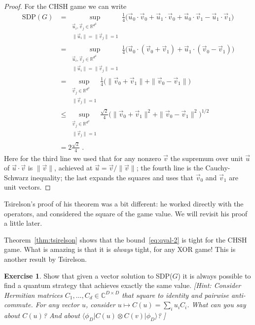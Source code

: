 \documentclass{report}
\theoremstyle{plain}
\theoremstyle{definition}
\newtheorem{exercise}[subsection]{Exercise}
\theoremstyle{remark}
\newcommand{\ket}[1]{|#1\rangle}
\newcommand{\bra}[1]{\langle#1|}
\newcommand{\C}{\ensuremath{\mathbb{C}}}
\newcommand{\R}{\ensuremath{\mathbb{R}}}
\numberwithin{equation}{subsection}
\begin{document}
\begin{proof}
For the CHSH game we can write
\begin{align*}
\text{SDP}(G) &= \sup_{\substack{\vec{u}_i,\vec{v}_j\in \R^{d^2}\\ \|\vec{u}_i\|=\|\vec{v}_j\|=1}} \frac{1}{4} \big(\vec{u}_0 \cdot \vec{v}_0 + \vec{u}_1 \cdot \vec{v}_0 + \vec{u}_0 \cdot \vec{v}_1 - \vec{u}_1 \cdot \vec{v}_1\big)\\
 &= \sup_{\substack{\vec{u}_i,\vec{v}_j\in \R^{d^2}\\ \|\vec{u}_i\|=\|\vec{v}_j\|=1}} \frac{1}{4} \big(\vec{u}_0 \cdot (\vec{v}_0 + \vec{v}_1) +  \vec{u}_1 \cdot (\vec{v}_0 -\vec{v}_1)\big)\\
 & = \sup_{\substack{\vec{v}_j\in \R^{d^2}\\ \|\vec{v}_j\|=1}} \frac{1}{4} \big(\|\vec{v}_0 + \vec{v}_1\| + \|\vec{v}_0 -\vec{v}_1\| \big)\\
 & \leq \sup_{\substack{\vec{v}_j\in \R^{d^2}\\ \|\vec{v}_j\|=1}} \frac{\sqrt{2}}{4} \big( \|\vec{v}_0 + \vec{v}_1\|^2 + \|\vec{v}_0 -\vec{v}_1\|^2\big)^{1/2} \\
&= 2\frac{\sqrt{2}}{4} \;.
\end{align*}
Here for the third line we used that for any nonzero $\vec{v}$ the supremum over unit $\vec{u}$ of $\vec{u}\cdot \vec{v}$ is $\|\vec{v}\|$, achieved at $\vec{u} = \vec{v}/\|\vec{v}\|$; the fourth line is the Cauchy-Schwarz inequality; the last expands the squares and uses that $\vec{v}_0$ and $\vec{v}_1$ are unit vectors. 
\end{proof}

Tsirelson's proof of his theorem was a bit different: he worked directly with the operators, and considered the square of the game value. We will revisit his proof a little later. 

Theorem~\ref{thm:tsirelson} shows that the bound~\eqref{eq:qval-2} is tight for the CHSH game. What is amazing is that it is \emph{always} tight, for any XOR game! This is another result by Tsirelson. 

\begin{exercise}\label{ex:tsirelson}
Show that given a vector solution to SDP($G$) it is always possible to find a quantum strategy that achieves exactly the same value. \emph{[Hint: Consider Hermitian matrices $C_1,\ldots,C_d \in \C^{D\times D}$ that square to identity and pairwise anti-commute. For any vector $u$, consider $u\mapsto C(u) = \sum_i u_i C_i$. What can you say about $C(u)$? And about $\bra{\phi_{D}} C(u) \otimes C(v)\ket{\phi_D}$? ]}
\end{exercise}
\end{document}

